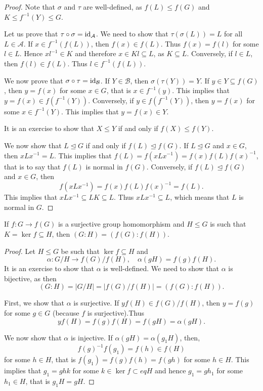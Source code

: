\begin{proof}
    Note that $\sigma$ and $\tau$ are well-defined, as 
    $f(L)\leq f(G)$ and $K\leq f^{-1}(Y)\leq G$.

    Let us prove that $\tau\circ\sigma=\operatorname{id}_\mathcal{A}$. We need to show that $\tau(\sigma(L))=L$ for all $L\in\mathcal{A}$. If $x\in f^{-1}(f(L))$, then $f(x)\in f(L)$. Thus $f(x)=f(l)$ for some
    $l\in L$. Hence $xl^{-1}\in K$ and therefore 
    $x\in Kl\subseteq L$, as $K\subseteq L$.
    Conversely, if $l\in L$, then $f(l)\in f(L)$. Thus $l\in f^{-1}(f(L))$.

    We now prove that $\sigma\circ\tau=\operatorname{id}_\mathcal{B}$. If  $Y\in\mathcal{B}$, then $\sigma(\tau(Y))=Y$. If $y\in Y\subseteq f(G)$, then $y=f(x)$ for some $x\in G$, that is $x\in f^{-1}(y)$. This implies that $y=f(x)\in f(f^{-1}(Y))$. Conversely, if $y\in f(f^{-1}(Y))$, then $y=f(x)$ for some $x\in f^{-1}(Y)$. This implies that $y=f(x)\in Y$.

    It is an exercise to show that 
    $X\leq Y$ if and only if $f(X)\leq f(Y)$.

    We now show that $L\unlhd G$ if and only if 
    $f(L)\unlhd f(G)$. If $L\unlhd G$ and $x\in G$,
    then $xLx^{-1}=L$. This implies that $f(L)=f(xLx^{-1})=f(x)f(L)f(x)^{-1}$, that is
    to say that $f(L)$ is normal in $f(G)$. Conversely, if
    $f(L)\unlhd f(G)$ and $x\in G$, then 
        \[
        f(xLx^{-1})=f(x)f(L)f(x)^{-1}=f(L).
        \]
    This implies that $xLx^{-1}\subseteq LK\subseteq L$. Thus 
    $xLx^{-1}\subseteq L$, which means that $L$ is normal in $G$. 
\end{proof}

\begin{proposition}
    If $f\colon G\to f(G)$ is a surjective group homomorphism 
    and $H\leq G$ is such that $K=\ker f
\subseteq H$, then
        $(G:H)=(f(G):f(H))$.
\end{proposition}

\begin{proof}
Let $H\leq G$ be such that
$\ker f\subseteq H$ and 
\[
\alpha\colon G/H\to f(G)/f(H),\quad \alpha(gH)=f(g)f(H).
\]
It is an exercise to show that $\alpha$ is well-defined. 
We need to show that $\alpha$ is bijective, as then 
\[
(G:H)=|G/H|=|f(G)/f(H)|=(f(G):f(H)).
\]

First, we show that $\alpha$ is surjective. If $yf(H)\in f(G)/f(H)$, 
then
$y=f(g)$ for some $g\in G$ (because $f$ is surjective).Thus
\[
yf(H)=f(g)f(H)=f(gH)=\alpha(gH).
\]

We now show that $\alpha$ is injective. If $\alpha(gH)=\alpha(g_1H)$, then, 
\[
f(g)^{-1}f(g_1)=f(h)\in f(H)
\]
for some $h\in H$, that is 
$f(g_1)=f(g)f(h)=f(gh)$ for some $h\in H$. 
This implies that $g_1=ghk$ for some $k\in\ker f\subset
eq H$ and hence 
$g_1=gh_1$ for some $h_1\in H$, that is $g_1H=gH$.
\end{proof}

